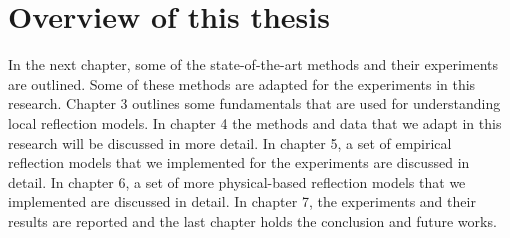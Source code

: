 \section{Overview of this thesis}
In the next chapter, some of the state-of-the-art methods and their experiments are outlined. Some of these methods are adapted for the experiments in this research. Chapter 3 outlines some fundamentals that are used for understanding local reflection models. In chapter 4 the methods and data that we adapt in this research will be discussed in more detail. In chapter 5, a set of empirical reflection models that we implemented for the experiments are discussed in detail. In chapter 6, a set of more physical-based reflection models that we implemented are discussed in detail. In chapter 7, the experiments and their results are reported and the last chapter holds the conclusion and future works.


